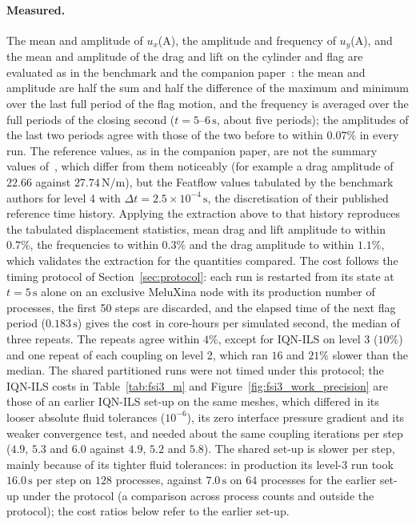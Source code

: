 \paragraph{Measured.}
The mean and amplitude of $u_x$(A), the amplitude and frequency of $u_y$(A), and the mean and amplitude of the drag and lift on the cylinder and flag are evaluated as in the benchmark and the companion paper~\citep{Turek2006, CardiffFSIVerification2026}: the mean and amplitude are half the sum and half the difference of the maximum and minimum over the last full period of the flag motion, and the frequency is averaged over the full periods of the closing second ($t = 5$--$6\,\mathrm{s}$, about five periods); the amplitudes of the last two periods agree with those of the two before to within $0.07\%$ in every run.
The reference values, as in the companion paper, are not the summary values of~\citet{Turek2006}, which differ from them noticeably (for example a drag amplitude of $22.66$ against $27.74\,\mathrm{N/m}$), but the Featflow values tabulated by the benchmark authors for level 4 with $\Delta t = 2.5\times10^{-4}\,\mathrm{s}$, the discretisation of their published reference time history.
Applying the extraction above to that history reproduces the tabulated displacement statistics, mean drag and lift amplitude to within $0.7\%$, the frequencies to within $0.3\%$ and the drag amplitude to within $1.1\%$, which validates the extraction for the quantities compared.
The cost follows the timing protocol of Section~\ref{sec:protocol}: each run is restarted from its state at $t = 5\,\mathrm{s}$ alone on an exclusive MeluXina node with its production number of processes, the first 50 steps are discarded, and the elapsed time of the next flag period ($0.183\,\mathrm{s}$) gives the cost in core-hours per simulated second, the median of three repeats.
The repeats agree within $4\%$, except for IQN-ILS on level 3 ($10\%$) and one repeat of each coupling on level 2, which ran $16$ and $21\%$ slower than the median.
The shared partitioned runs were not timed under this protocol; the IQN-ILS costs in Table~\ref{tab:fsi3_m} and Figure~\ref{fig:fsi3_work_precision} are those of an earlier IQN-ILS set-up on the same meshes, which differed in its looser absolute fluid tolerances ($10^{-6}$), its zero interface pressure gradient and its weaker convergence test, and needed about the same coupling iterations per step ($4.9$, $5.3$ and $6.0$ against $4.9$, $5.2$ and $5.8$).
The shared set-up is slower per step, mainly because of its tighter fluid tolerances: in production its level-3 run took $16.0\,\mathrm{s}$ per step on $128$ processes, against $7.0\,\mathrm{s}$ on $64$ processes for the earlier set-up under the protocol (a comparison across process counts and outside the protocol); the cost ratios below refer to the earlier set-up.

